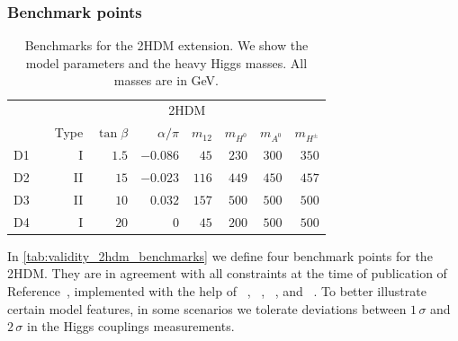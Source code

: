 \subsubsection{Benchmark points}

\begin{table} 
  \begin{tabular}{c c rrrrrrr }
    \toprule
    \multirow{2}{*}{} && \multicolumn{7}{c}{2HDM} \\
    \cmidrule{3-9}
    && Type & $\tan\beta$ & $\alpha/\pi$
    & $m_{12} $ & $m_{H^0} $ & $m_{A^0} $ & $m_{H^\pm}$ \\
    \midrule
    D1 && I & $1.5$ & $-0.086$ & $45$ & $230$ & $300$ & $350$ \\
    D2 && II & $15$ & $-0.023$ & $116$ & $449$ & $450$ & $457$ \\
    D3 && II & $10$ & $0.032$ & $157$ & $500$ & $500$ & $500$ \\
    D4 && I & $20$ & $0$ & $45$ & $200$ & $500$ & $500$ \\
    \bottomrule
  \end{tabular}
 \caption[Benchmarks for the 2HDM model]{Benchmarks
   for the 2HDM extension. We show the model
   parameters and the heavy Higgs masses. All masses are in GeV.}
 \label{tab:validity_2hdm_benchmarks}
\end{table}

In \autoref{tab:validity_2hdm_benchmarks} we define four benchmark
points for the 2HDM. They are in agreement with all constraints at the
time of publication of Reference~\cite{Brehmer:2015rna}, implemented with
the help of ~\cite{Eriksson:2009ws},
~\cite{Bechtle:2008jh, Bechtle:2011sb},
~\cite{Mahmoudi:2008tp}, and
~\cite{Bechtle:2013xfa}. To better illustrate
certain model features, in some scenarios we tolerate deviations
between $1\,\sigma$ and $2\,\sigma$ in the Higgs couplings
measurements.

